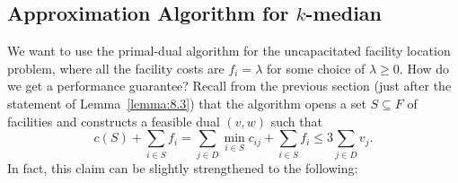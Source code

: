 \subsection{Approximation Algorithm for $k$-median} \label{subsec:9.3}
We want to use the primal-dual algorithm for the uncapacitated facility 
location problem, where all the facility costs are $f_i = \lambda$ 
for some choice of $\lambda \geq 0$. How do we get a performance 
guarantee? Recall from the previous section (just after the statement
of Lemma~\ref{lemma:8.3}) that the algorithm opens a set $S \subseteq F$ 
of facilities and constructs a feasible dual $(v, w)$ such that 
\[ c(S) + \sum_{i\in S} f_i = \sum_{j\in D} \min_{i\in S} c_{ij} + \sum_{i\in S} f_i \leq 3 
\sum_{j\in D} v_j. \] 
In fact, this claim can be slightly strengthened to the following: 

